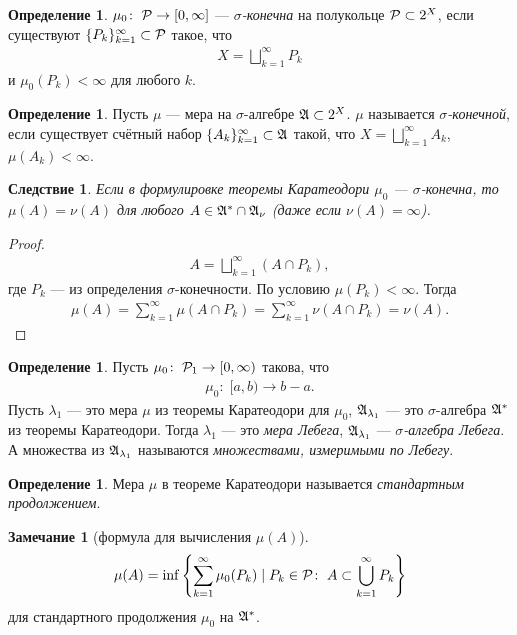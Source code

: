 \documentclass[a4paper,14pt]{extarticle}
\newcounter{theoremCnt}
\theoremstyle{definition}
\newtheorem{df}[theoremCnt]{Определение}
\theoremstyle{plain}
\theoremstyle{plain}
\theoremstyle{plain}
\newtheorem{crly}[theoremCnt]{Следствие}
\theoremstyle{plain}
\theoremstyle{definition}
\theoremstyle{definition}
\newtheorem{remrk}[theoremCnt]{Замечание}
\theoremstyle{definition}
\theoremstyle{definition}
\theoremstyle{definition}
\theoremstyle{definition}
\theoremstyle{plain}
\theoremstyle{plain}
\theoremstyle{plain}
\theoremstyle{plain}
\theoremstyle{definition}
\theoremstyle{definition}
\theoremstyle{definition}
\theoremstyle{definition}
\theoremstyle{definition}
\newcommand{\A}{\ensuremath \mathfrak{A}}
\newcommand{\p}{\ensuremath \mathcal{P}}
\begin{document}
\begin{df}
 $\mu_0 \colon\; \p \to [0, \infty]$ --- \textit{$\sigma$-конечна} на полукольце $\p \subset 2^{X}$, если существуют $\{P_k\}_{k=1}^{\infty} \subset \p $ такое, что
 \begin{align*}
  X = \bigsqcup_{k=1}^{\infty} P_k
 \end{align*} и $\mu_0(P_k) < \infty$ для любого $k$.
\end{df}
\begin{df}
 Пусть $\mu$ --- мера на $\sigma$-алгебре $\A \subset 2^{X}$. $\mu$ называется \textit{$\sigma$-конечной}, если существует счётный набор $\{A_k\}_{k=1}^{\infty} \subset \A $ такой, что $X = \bigsqcup_{k=1}^{\infty} A_k $, $\mu(A_k) < \infty$.
\end{df}
\begin{crly}
 Если в формулировке теоремы Каратеодори $\mu_0$ --- $\sigma$-конечна, то $\mu(A) = \nu(A)$ для любого $A \in \A^{\ast} \cap \A_{\nu}$ (даже если $\nu(A) = \infty$).
\end{crly}
\begin{proof}
 \begin{align*}
  A = \bigsqcup_{k=1}^{\infty} (A \cap P_k)
 ,\end{align*} где $P_k$ --- из определения $\sigma$-конечности. По условию  $\mu(P_k) < \infty$. Тогда
 \begin{align*}
  \mu(A) = \sum_{k=1}^{\infty} \mu(A \cap P_k) = \sum_{k=1}^{\infty} \nu(A \cap P_k) = \nu(A)
 .\end{align*}
\end{proof}
\begin{df}
 Пусть $\mu_0 \colon\; \p_1 \to [0, \infty)$ такова, что
 \begin{align*}
  \mu_0 \colon\; [a, b) \to b - a
 .\end{align*} Пусть $\lambda_1$ --- это мера  $\mu$ из теоремы Каратеодори для $\mu_0$, $\A_{\lambda_1}$ --- это $\sigma$-алгебра $\A^{\ast}$ из теоремы Каратеодори. Тогда $\lambda_1$ --- это \textit{мера Лебега}, $\A_{\lambda_1}$ --- \textit{$\sigma$-алгебра Лебега}. А множества из $\A_{\lambda_1}$ называются \textit{множествами, измеримыми по Лебегу}.
\end{df}
\begin{df}
 Мера $\mu$ в теореме Каратеодори называется \textit{стандартным продолжением}.
\end{df}
\begin{remrk}[формула для вычисления $\mu(A)$]
 \begin{align*}
  \mu(A) = \inf \left\{ \sum_{k=1}^{\infty} \mu_0(P_k) \mid P_k \in \p \colon\; A \subset \bigcup_{k=1}^{\infty} P_k \right\}
 \end{align*}
 для стандартного продолжения $\mu_{0}$ на $\A^{\ast}$.
\end{remrk}
\end{document}
